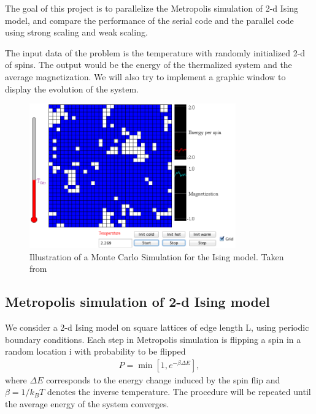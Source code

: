 \documentclass[runningheads]{llncs}
\begin{document}
The goal of this project is to parallelize the Metropolis simulation of 2-d Ising model, and compare the performance of the serial code and the parallel code using strong scaling and weak scaling.

The input data of the problem is the temperature  with randomly initialized 2-d of spins. 
The output would be the energy of the thermalized system and the average magnetization.
We will also try to implement a graphic window to display the evolution of the system.
\begin{figure}
\begin{center}
\includegraphics[width=3.5in]{./Ising_graphic.png}
\caption[]{ Illustration of a Monte Carlo Simulation for the Ising model. Taken from \cite{Young}}
\label{sample-figure}
\end{center}
\end{figure}


\subsection{Metropolis simulation of 2-d Ising  model}
We consider a 2-d Ising model on square lattices of edge length L, using periodic boundary conditions. Each step in Metropolis simulation is flipping a spin in a random location i with probability to be flipped
\begin{eqnarray}
P=\min[1, e^{-\beta \Delta E}],
\end{eqnarray}
where $\Delta E$ corresponds to the energy change induced by the spin flip and $\beta=1/k_BT$ denotes the inverse temperature.
The procedure will be repeated until the average energy of the system converges.
\end{document}
